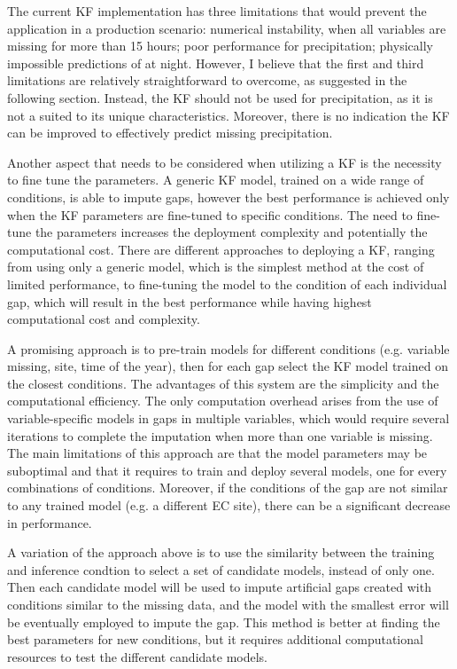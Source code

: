 \documentclass{article}
\begin{document}
The current KF implementation has three limitations that would prevent the application in a production scenario: numerical instability, when all variables are missing for more than 15 hours; poor performance for precipitation; physically impossible predictions of  at night. However, I believe that the first and third limitations are relatively straightforward to overcome, as suggested in the following section. Instead, the KF should not be used for precipitation, as it is not a suited to its unique characteristics. Moreover, there is no indication the KF can be improved to effectively predict missing precipitation.

Another aspect that needs to be considered when utilizing a KF is the necessity to fine tune the parameters.
A generic KF model, trained on a wide range of conditions, is able to impute gaps, however the best performance is achieved only when the KF parameters are fine-tuned to specific conditions.
The need to fine-tune the parameters increases the deployment complexity and potentially the computational cost.
There are different approaches to deploying a KF, ranging from using only a generic model, which is the simplest method at the cost of limited performance, to fine-tuning the model to the condition of each individual gap, which will result in the best performance while having highest computational cost and complexity.

A promising approach is to pre-train models for different conditions (e.g. variable missing, site, time of the year), then for each gap select the KF model trained on the closest conditions. The advantages of this system are the simplicity and the computational efficiency. The  only computation overhead arises from the use of variable-specific models in gaps in multiple variables, which would require several iterations to complete the imputation when more than one variable is missing.
The main limitations of this approach are that the model parameters may be suboptimal and that it requires to train and deploy several models, one for every combinations of conditions.
Moreover, if the conditions of the gap are not similar to any trained model (e.g. a different EC site), there can be a significant decrease in performance.

A variation of the approach above is to use the similarity between the training and inference condtion to select a set of candidate models, instead of only one. Then each candidate model will be used to impute artificial gaps created with conditions similar to the missing data, and the model with the smallest error will be eventually employed to impute the gap. This method is better at finding the best parameters for new conditions, but it requires additional computational resources to test the different candidate models.
\end{document}
